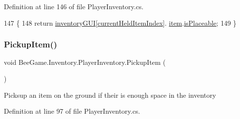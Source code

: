 Definition at line 146 of file Player\+Inventory.\+cs.


\begin{DoxyCode}
147         \{
148             \textcolor{keywordflow}{return} \hyperlink{class_bee_game_1_1_inventory_1_1_inventory_base_a48dcba7ad7bfa1bed8c9ae290fb32857}{inventoryGUI}[\hyperlink{class_bee_game_1_1_inventory_1_1_player_inventory_ac2978979c5c8e45fccc7d3a10882ea1b}{currentHeldItemIndex}].
      \hyperlink{class_bee_game_1_1_inventory_1_1_inventory_slot_a31b201e7eef9ed0001a447b3f76a7a81}{item}.\hyperlink{struct_bee_game_1_1_items_1_1_item_ae95da57ec69cdb64b656caa5aa42b8c7}{isPlaceable};
149         \}
\end{DoxyCode}
\mbox{\label{class_bee_game_1_1_inventory_1_1_player_inventory_a84caefeadcff40e4fd6e888307a7a1e9}} 
\subsubsection{\texorpdfstring{Pickup\+Item()}{PickupItem()}}
{\footnotesize\ttfamily void Bee\+Game.\+Inventory.\+Player\+Inventory.\+Pickup\+Item (\begin{DoxyParamCaption}{ }\end{DoxyParamCaption})\hspace{0.3cm}{\ttfamily [private]}}



Picksup an item on the ground if their is enough space in the inventory 



Definition at line 97 of file Player\+Inventory.\+cs.


